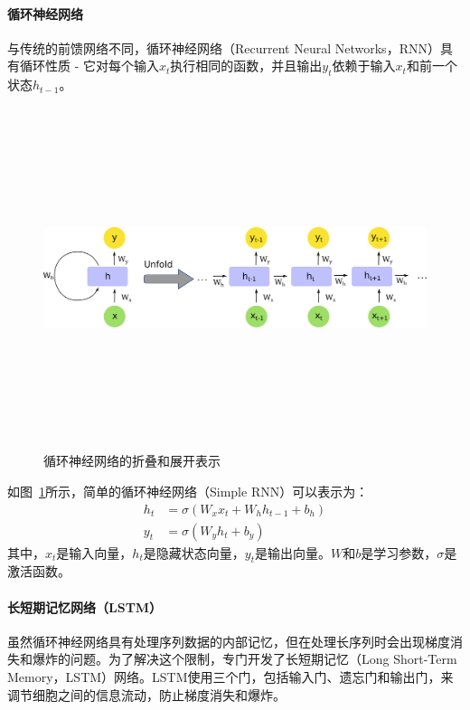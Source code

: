 \paragraph*{循环神经网络}
与传统的前馈网络不同，循环神经网络（Recurrent Neural Networks，RNN）具有循环性质 - 它对每个输入$x_t$执行相同的函数，并且输出$y_t$依赖于输入$x_t$和前一个状态$h_{t-1}$。

\begin{figure}
\centering
\includegraphics[width=16cm,height=10cm,keepaspectratio]{rnn.pdf}
\caption{循环神经网络的折叠和展开表示}
\label{fig:rnn}
\end{figure}

如图~\ref{fig:rnn}所示，简单的循环神经网络（Simple RNN）可以表示为：
\begin{align*}
h_t &= \sigma(W_x x_t + W_h h_{t-1} + b_h) \\
y_t &= \sigma(W_y h_t + b_y)
\end{align*}
其中，$x_t$是输入向量，$h_t$是隐藏状态向量，$y_t$是输出向量。$W$和$b$是学习参数，$\sigma$是激活函数。

\paragraph*{长短期记忆网络（LSTM）}
虽然循环神经网络具有处理序列数据的内部记忆，但在处理长序列时会出现梯度消失和爆炸的问题。为了解决这个限制，专门开发了长短期记忆（Long Short-Term Memory，LSTM）网络。LSTM使用三个门，包括输入门、遗忘门和输出门，来调节细胞之间的信息流动，防止梯度消失和爆炸。

